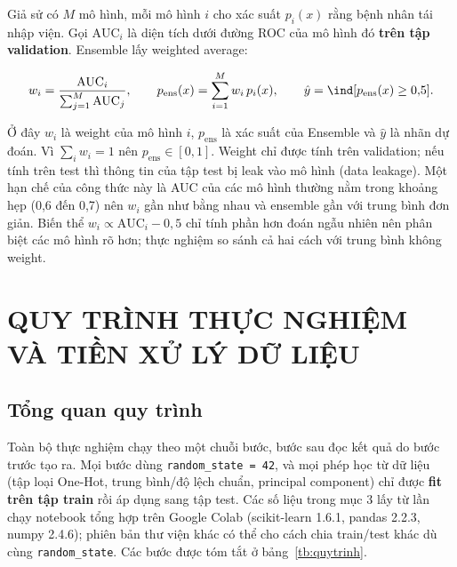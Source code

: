 \documentclass[a4paper]{report}
\begin{document}
Giả sử có $M$ mô hình, mỗi mô hình $i$ cho xác suất $p_i(x)$ rằng bệnh nhân tái nhập viện. Gọi $\mathrm{AUC}_i$ là diện tích dưới đường ROC của mô hình đó \textbf{trên tập validation}. Ensemble lấy weighted average:

\begin{equation}
  w_i = \frac{\mathrm{AUC}_i}{\sum_{j=1}^{M}\mathrm{AUC}_j},\qquad p_{\text{ens}}(x) = \sum_{i=1}^{M} w_i\,p_i(x),\qquad \hat y = \ind[p_{\text{ens}}(x) \ge 0{,}5].
\end{equation}

Ở đây $w_i$ là weight của mô hình $i$, $p_{\text{ens}}$ là xác suất của Ensemble và $\hat y$ là nhãn dự đoán. Vì $\sum_i w_i = 1$ nên $p_{\text{ens}} \in [0, 1]$. Weight chỉ được tính trên validation; nếu tính trên test thì thông tin của tập test bị leak vào mô hình (data leakage). Một hạn chế của công thức này là AUC của các mô hình thường nằm trong khoảng hẹp (0,6 đến 0,7) nên $w_i$ gần như bằng nhau và ensemble gần với trung bình đơn giản. Biến thể $w_i \propto \mathrm{AUC}_i - 0{,}5$ chỉ tính phần hơn đoán ngẫu nhiên nên phân biệt các mô hình rõ hơn; thực nghiệm so sánh cả hai cách với trung bình không weight.


\section{QUY TRÌNH THỰC NGHIỆM VÀ TIỀN XỬ LÝ DỮ LIỆU}

\subsection{Tổng quan quy trình}

Toàn bộ thực nghiệm chạy theo một chuỗi bước, bước sau đọc kết quả do bước trước tạo ra. Mọi bước dùng \texttt{random\_\allowbreak{}state = 42}, và mọi phép học từ dữ liệu (tập loại One-Hot, trung bình/độ lệch chuẩn, principal component) chỉ được \textbf{fit trên tập train} rồi áp dụng sang tập test. Các số liệu trong mục 3 lấy từ lần chạy notebook tổng hợp trên Google Colab (scikit-learn 1.6.1, pandas 2.2.3, numpy 2.4.6); phiên bản thư viện khác có thể cho cách chia train/test khác dù cùng \texttt{random\_\allowbreak{}state}. Các bước được tóm tắt ở bảng~\ref{tb:quytrinh}.
\end{document}
